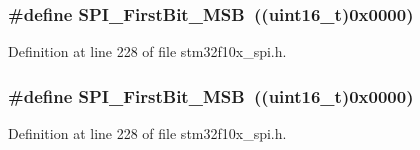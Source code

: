 \subsubsection[{\texorpdfstring{S\+P\+I\+\_\+\+First\+Bit\+\_\+\+M\+SB}{SPI_FirstBit_MSB}}]{\setlength{\rightskip}{0pt plus 5cm}\#define S\+P\+I\+\_\+\+First\+Bit\+\_\+\+M\+SB~(({\bf uint16\+\_\+t})0x0000)}\hypertarget{group___s_p_i___m_s_b___l_s_b__transmission_ga45e688f93a93b605886240cad23bc2eb}{}\label{group___s_p_i___m_s_b___l_s_b__transmission_ga45e688f93a93b605886240cad23bc2eb}


Definition at line 228 of file stm32f10x\+\_\+spi.\+h.

\subsubsection[{\texorpdfstring{S\+P\+I\+\_\+\+First\+Bit\+\_\+\+M\+SB}{SPI_FirstBit_MSB}}]{\setlength{\rightskip}{0pt plus 5cm}\#define S\+P\+I\+\_\+\+First\+Bit\+\_\+\+M\+SB~(({\bf uint16\+\_\+t})0x0000)}\hypertarget{group___s_p_i___m_s_b___l_s_b__transmission_ga45e688f93a93b605886240cad23bc2eb}{}\label{group___s_p_i___m_s_b___l_s_b__transmission_ga45e688f93a93b605886240cad23bc2eb}


Definition at line 228 of file stm32f10x\+\_\+spi.\+h.

